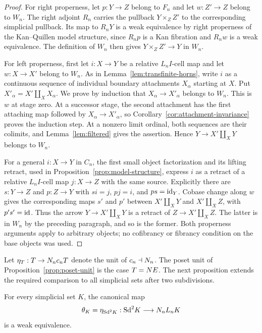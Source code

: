 \begin{proof}
For right properness, let $p:Y\to Z$ belong to $F_n$ and let
$w:Z'\to Z$ belong to $W_n$.  The right adjoint $R_n$ carries the
pullback $Y\times_Z Z'$ to the corresponding simplicial pullback.
Its map to $R_nY$ is a weak equivalence by right properness of the
Kan--Quillen model structure, since $R_np$ is a Kan fibration and
$R_nw$ is a weak equivalence.  The definition of $W_n$ then gives
$Y\times_Z Z'\to Y$ in $W_n$.

For left properness, first let $i:X\to Y$ be a relative
$L_nI$-cell map and let $w:X\to X'$ belong to $W_n$.  As in
Lemma~\ref{lem:transfinite-horns}, write $i$ as a continuous
sequence of individual boundary attachments $X_\alpha$ starting
at $X$.  Put $X'_\alpha=X'\amalg_X X_\alpha$.
We prove by induction that $X_\alpha\to X'_\alpha$ belongs to
$W_n$.  This is $w$ at stage zero.  At a successor stage, the
second attachment has the first attaching map followed by
$X_\alpha\to X'_\alpha$, so
Corollary~\ref{cor:attachment-invariance} proves the induction
step.  At a nonzero limit ordinal, both sequences are their
colimits, and Lemma~\ref{lem:filtered} gives the assertion.  Hence
$Y\to X'\amalg_XY$ belongs to $W_n$.

For a general $i:X\to Y$ in $C_n$, the first small object
factorization and its lifting retract, used in
Proposition~\ref{prop:model-structure}, express $i$ as a retract
of a relative $L_nI$-cell map $j:X\to Z$ with the same source.
Explicitly there are $s:Y\to Z$ and $p:Z\to Y$ with
$si=j$, $pj=i$, and $ps=\mathrm{id}_Y$.  Cobase change along $w$ gives
the corresponding maps $s'$ and $p'$ between
$X'\amalg_XY$ and $X'\amalg_XZ$, with $p's'=\mathrm{id}$.
Thus the arrow $Y\to X'\amalg_XY$ is a retract of
$Z\to X'\amalg_XZ$.  The latter is in $W_n$ by the preceding
paragraph, and so is the former.  Both properness arguments apply
to arbitrary objects; no cofibrancy or fibrancy condition on the
base objects was used.
\end{proof}

Let $\eta_T:T\to N_n c_nT$ denote the unit of
$c_n\dashv N_n$.  The poset unit of
Proposition~\ref{prop:poset-unit} is the case $T=N E$.
The next proposition extends the required comparison to all
simplicial sets after two subdivisions.

\begin{proposition}\label{prop:subdivided-unit}
For every simplicial set $K$, the canonical map
\begin{equation}\label{eq:subdivided-unit}
 \theta_K=\eta_{\mathrm{Sd}^2K}:\mathrm{Sd}^2K\longrightarrow N_n L_nK
\end{equation}
is a weak equivalence.
\end{proposition}

